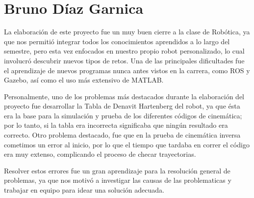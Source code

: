 \section{Bruno Díaz Garnica}
La elaboración de este proyecto fue un muy buen cierre a la clase de Robótica, ya que nos permitió integrar todos los conocimientos aprendidos a lo largo del semestre, pero esta vez enfocados en nuestro propio robot personalizado, lo cual involucró descubrir nuevos tipos de retos. Una de las principales dificultades fue el aprendizaje de nuevos programas nunca antes vistos en la carrera, como ROS y Gazebo, así como el uso más extensivo de MATLAB. 

Personalmente, uno de los problemas más destacados durante la elaboración del proyecto fue desarrollar la Tabla de Denavit Hartenberg del robot, ya que ésta era la base para la simulación y prueba de los diferentes códigos de cinemática; por lo tanto, si la tabla era incorrecta significaba que ningún resultado era correcto. Otro problema destacado, fue que en la prueba de cinemática inversa cometimos un error al inicio, por lo que el tiempo que tardaba en correr el código era muy extenso, complicando el proceso de checar trayectorias. 

Resolver estos errores fue un gran aprendizaje para la resolución general de problemas, ya que nos motivó a investigar las causas de las problematicas y trabajar en equipo para idear una solución adecuada. 